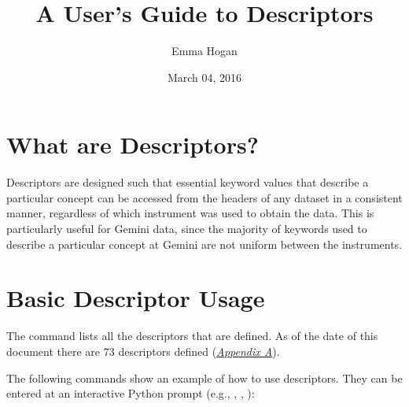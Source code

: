 \documentclass[letterpaper,10pt,english]{sphinxmanual}
\title{A User's Guide to Descriptors}
\date{March 04, 2016}
\author{Emma Hogan}
\begin{document}
\maketitle
\tableofcontents
{}\label{index-latex::doc}



\chapter{What are Descriptors?}
\label{whataredescriptors:a-user-s-guide-to-descriptors}\label{whataredescriptors::doc}\label{whataredescriptors:what-are-descriptors}\label{whataredescriptors:id1}
Descriptors are designed such that essential keyword values that describe a
particular concept can be accessed from the headers of any dataset in a
consistent manner, regardless of which instrument was used to obtain the
data. This is particularly useful for Gemini data, since the majority of
keywords used to describe a particular concept at Gemini are not uniform
between the instruments.


\chapter{Basic Descriptor Usage}
\label{basicusage:basic-descriptor-usage}\label{basicusage::doc}\label{basicusage:id1}
The command  lists all the descriptors that are defined. As of
the date of this document there are 73 descriptors defined ({\hyperref[appendices/appendixA:appendix-typewalk]{\emph{Appendix A}}}).

The following commands show an example of how to use descriptors. They can be
entered at an interactive Python prompt (e.g., , ,
):
\end{document}
